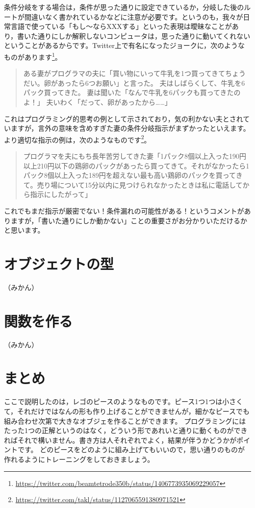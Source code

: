 \documentclass{ltjsbook}
\begin{document}
条件分岐をする場合は，条件が思った通りに設定できているか，分岐した後のルートが間違いなく書かれているかなどに注意が必要です。というのも，我々が日常言語で使っている「もし〜ならXXXする」といった表現は曖昧なことがあり，書いた通りにしか解釈しないコンピュータは，思った通りに動いてくれないということがあるからです。Twitter上で有名になったジョークに，次のようなものがあります\footnote{\url{https://twitter.com/beamtetrode350b/status/1406773935069229057}}。

\begin{quote}
	ある妻がプログラマの夫に「買い物にいって牛乳を1つ買ってきてちょうだい。卵があったら6つお願い」と言った。
	夫はしばらくして、牛乳を6パック買ってきた。
	妻は聞いた「なんで牛乳を6パックも買ってきたのよ！」
	夫いわく「だって、卵があったから……」
\end{quote}

これはプログラミング的思考の例として示されており，気の利かない夫とされていますが，言外の意味を含めすぎた妻の条件分岐指示がまずかったといえます。より適切な指示の例は，次のようなものです\footnote{\url{https://twitter.com/takl/status/1127065591380971521}}。

\begin{quote}
	プログラマを夫にもち長年苦労してきた妻「1パック8個以上入った190円以上210円以下の鶏卵のパックがあったら買ってきて。それがなかったら1パック8個以上入った189円を超えない最も高い鶏卵のパックを買ってきて。売り場について15分以内に見つけられなかったときは私に電話してから指示にしたがって」
\end{quote}

これでもまだ指示が厳密でない！条件漏れの可能性がある！というコメントがありますが，「書いた通りにしか動かない」ことの重要さがお分かりいただけるかと思います。


\section{オブジェクトの型}

（みかん）

\section{関数を作る}

（みかん）

\section{まとめ}
ここで説明したのは，レゴのピースのようなものです。ピース1つ1つは小さくて，それだけではなんの形も作り上げることができませんが，細かなピースでも組み合わせ次第で大きなオブジェを作ることができます。
プログラミングにはたった1つの正解というのはなく，どういう形であれいと通りに動くものができればそれで構いません。書き方は人それぞれでよく，結果が伴うかどうかがポイントです。
どのピースをどのように組み上げてもいいので，思い通りのものが作れるようにトレーニングをしておきましょう。
\end{document}
